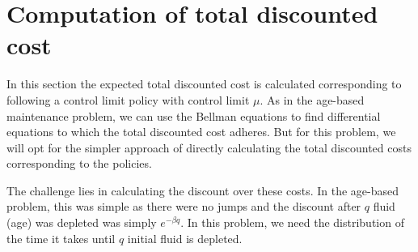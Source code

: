 \section{Computation of total discounted cost}
In this section the expected total discounted cost is calculated corresponding to following a control limit policy with control limit $\mu$.
As in the age-based maintenance problem, we can use the Bellman equations to find differential equations to which the total discounted cost adheres.
But for this problem, we will opt for the simpler approach of directly calculating the total discounted costs corresponding to the policies.

The challenge lies in calculating the discount over these costs.
In the age-based problem, this was simple as there were no jumps and the discount after $q$ fluid (age) was depleted was simply $e^{-\beta q}$.
In this problem, we need the distribution of the time it takes until $q$ initial fluid is depleted.


